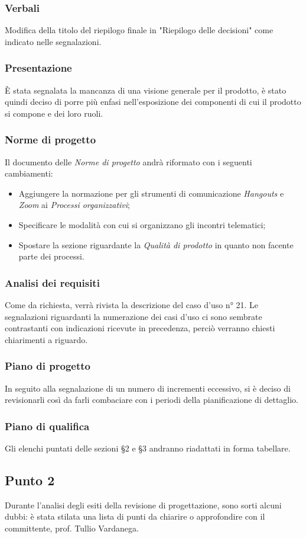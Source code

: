         \subsubsection{Verbali}
            Modifica della titolo del riepilogo finale in "Riepilogo delle decisioni" come indicato nelle segnalazioni.
        \subsubsection{Presentazione}
            È stata segnalata la mancanza di una visione generale per il prodotto, è stato quindi deciso di porre più enfasi nell'esposizione dei componenti di cui il prodotto si compone e dei loro ruoli.
        \subsubsection{Norme di progetto}
            Il documento delle \textit{Norme di progetto} andrà riformato con i seguenti cambiamenti:
            \begin{itemize}
                \item Aggiungere la normazione per gli strumenti di comunicazione \textit{Hangouts} e \textit{Zoom} ai \textit{Processi organizzativi};
                \item  Specificare le modalità con cui si organizzano gli incontri telematici;
                \item Spostare la sezione riguardante la \textit{Qualità di prodotto} in quanto non facente parte dei processi.
            \end{itemize}
        \subsubsection{Analisi dei requisiti}
            Come da richiesta, verrà rivista la descrizione del caso d'uso n° 21. Le segnalazioni riguardanti la numerazione dei casi d'uso ci sono sembrate contrastanti con indicazioni ricevute in precedenza, perciò verranno chiesti chiarimenti a riguardo.
        \subsubsection{Piano di progetto}
            In seguito alla segnalazione di un numero di incrementi eccessivo, si è deciso di revisionarli così da farli combaciare con i periodi della pianificazione di dettaglio.
        \subsubsection{Piano di qualifica}
            Gli elenchi puntati delle sezioni §2 e §3 andranno riadattati in forma tabellare.
    \subsection{Punto 2}
        Durante l'analisi degli esiti della revisione di progettazione, sono sorti alcuni dubbi: è stata stilata una lista di punti da chiarire o approfondire con il committente, prof. Tullio Vardanega.
